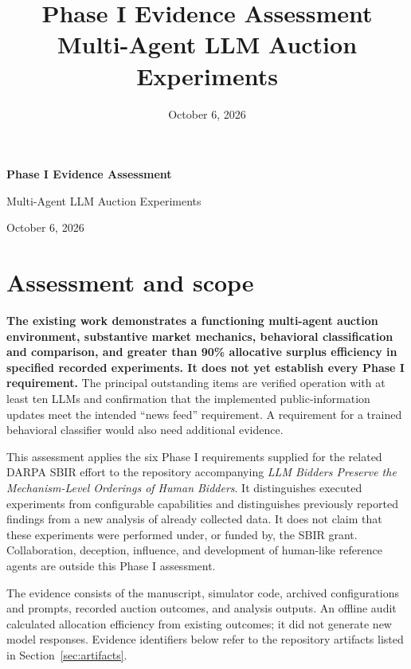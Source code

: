 \documentclass[11pt,letterpaper]{article}
\title{Phase I Evidence Assessment\\\large Multi-Agent LLM Auction Experiments}
\author{}
\date{October 6, 2026}
\begin{document}
\begin{center}
{\LARGE\bfseries Phase I Evidence Assessment\par}
{\large Multi-Agent LLM Auction Experiments\par}
October 6, 2026
\end{center}

\section{Assessment and scope}

\textbf{The existing work demonstrates a functioning multi-agent auction
environment, substantive market mechanics, behavioral classification and
comparison, and greater than 90\% allocative surplus efficiency in specified
recorded experiments. It does not yet establish every Phase I requirement.}
The principal outstanding items are verified operation with at least ten LLMs
and confirmation that the implemented public-information updates meet the
intended ``news feed'' requirement. A requirement for a trained behavioral
classifier would also need additional evidence.

This assessment applies the six Phase I requirements supplied for the related
DARPA SBIR effort to the repository accompanying \emph{LLM Bidders Preserve the
Mechanism-Level Orderings of Human Bidders}. It distinguishes executed
experiments from configurable capabilities and distinguishes previously
reported findings from a new analysis of already collected data. It does not
claim that these experiments were performed under, or funded by, the SBIR
grant. Collaboration, deception, influence, and development of human-like
reference agents are outside this Phase I assessment.

The evidence consists of the manuscript, simulator code, archived
configurations and prompts, recorded auction outcomes, and analysis outputs.
An offline audit calculated allocation efficiency from existing outcomes;
it did not generate new model responses. Evidence identifiers below refer to
the repository artifacts listed in Section~\ref{sec:artifacts}.
\end{document}
